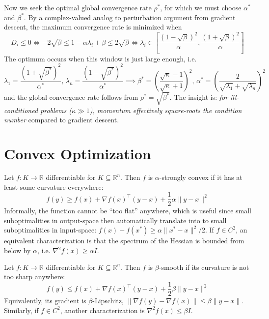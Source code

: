\documentclass[11pt, letterpaper]{article}
\begin{document}
\begin{remark}
    Now we seek the optimal global convergence rate \(\rho^*\), for which we must choose \(\alpha^*\) and \(\beta^*\). By a complex-valued analog to perturbation argument from gradient descent, the maximum convergence rate is minimized when 
    \[
        D_i \leq 0 
        \iff -2\sqrt{\beta} \leq 1 - \alpha \lambda_i + \beta \leq 2\sqrt{\beta} 
        \iff \lambda_i \in \left[ \frac{(1 - \sqrt{\beta})^2}{\alpha}, \frac{(1 + \sqrt{\beta})^2}{\alpha} \right]
    \]
    The optimum occurs when this window is just large enough, i.e. 
    \[
        \lambda_1 = \frac{(1 + \sqrt{\beta^*})^2}{\alpha^*},\,
        \lambda_n = \frac{(1 - \sqrt{\beta^*})^2}{\alpha^*}
        \implies \beta^* = \left( \frac{\sqrt{\kappa}-1}{\sqrt{\kappa}+1} \right)^2, 
        \, \alpha^* = \left(\frac{2}{\sqrt{\lambda_1} + \sqrt{\lambda_n}}\right)^2
    \]
    and the global convergence rate follows from \(\rho^* = \sqrt{\beta^*}\). The insight is: \textit{for ill-conditioned problems (\(\kappa \gg 1\)), momentum effectively square-roots the condition number} compared to gradient descent.
\end{remark}

\newpage
\part{Convex Optimization}

\begin{concept}
    Let \(f : K \to \mathbb{R}\) differentiable for \(K \subseteq \mathbb{R}^n\). Then \(f\) is \(\alpha\)-strongly convex if it has at least some curvature everywhere: 
    \[
        f(y) \geq f(x) + \nabla f(x)^\top (y - x) + \frac{1}{2}\alpha \|y - x\|^2
    \]
    Informally, the function cannot be ``too flat'' anywhere, which is useful since small suboptimalities in output-space then automatically translate into to small suboptimalities in input-space: \(f(x) - f(x^*) \geq \alpha \|x^* - x\|^2 /2\). If \(f \in C^2\), an equivalent characterization is that the spectrum of the Hessian is bounded from below by \(\alpha\), i.e. \(\nabla^2 f(x) \geq \alpha I\). 
\end{concept}

\begin{concept}[Smoothness]
    Let \(f : K \to \mathbb{R}\) differentiable for \(K \subseteq \mathbb{R}^n\). Then \(f\) is \(\beta\)-smooth if its curvature is not too sharp anywhere: 
    \[
        f(y) \leq f(x) + \nabla f(x)^\top (y - x) + \frac{1}{2}\beta \|y - x\|^2
    \]
    Equivalently, its gradient is \(\beta\)-Lipschitz, \(\|\nabla f(y) - \nabla f(x)\| \leq \beta \|y - x\|\). Similarly, if \(f \in C^2\), another characterization is \(\nabla^2 f(x) \leq \beta I\). 
\end{concept}
\end{document}
